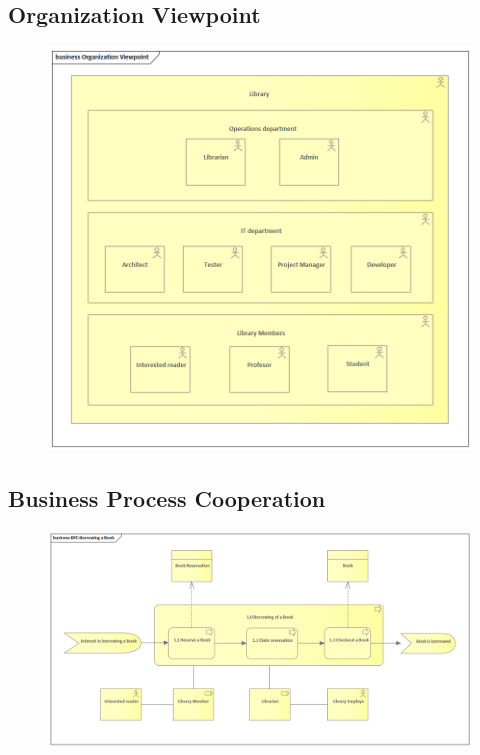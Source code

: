 \documentclass[11pt,twoside,a4paper]{article}
\begin{document}
\pagebreak
\subsection{Organization Viewpoint}
\begin{figure}[!ht]
    \includegraphics[scale=.9]{../ea/Organization Viewpoint.png}
    \centering
\end{figure}

\pagebreak
\subsection{Business Process Cooperation}
\begin{figure}[!ht]
    \includegraphics[scale=.65]{../ea/BPC-Borrowing a Book.png}
    \centering
\end{figure}
\end{document}
